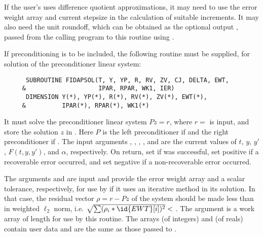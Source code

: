 \begin{Steps}
  If the user's  uses difference quotient approximations, it
  may need to use the error weight array  and current stepsize 
  in the calculation of suitable increments.  It may also need the unit
  roundoff, which can be obtained as the optional output ,
  passed from the calling program to this routine using .

  If preconditioning is to be included, the following routine must be
  supplied, for solution of the preconditioner linear system:
\begin{verbatim}
      SUBROUTINE FIDAPSOL(T, Y, YP, R, RV, ZV, CJ, DELTA, EWT, 
     &                    IPAR, RPAR, WK1, IER)
      DIMENSION Y(*), YP(*), R(*), RV(*), ZV(*), EWT(*), 
     &          IPAR(*), RPAR(*), WK1(*)
\end{verbatim}
  It must solve the preconditioner linear system $Pz = r$, where $r =$  
  is input, and store the solution $z$ in . Here $P$ is the left 
  preconditioner if  and the right preconditioner if .
  The input arguments , , , , and  are the
  current values of $t$, $y$, $y'$, $F(t,y,y')$, and $\alpha$, respectively.
  On return, set  if  was successful, set 
  positive if a recoverable error occurred, and set  negative if a 
  non-recoverable error occurred.

  The arguments  and  are input and provide the error weight
  array and a scalar tolerance, respectively, for use by  if it uses
  an iterative method in its solution.  In that case, the residual vector
  $\rho = r - Pz$ of the system should be made less than  in weighted
  $\ell_2$ norm, i.e. $\sqrt{\sum(\rho_i * \id{EWT}[i])^2} < $ .
  The argument  is a work array of length  for use by this
  routine.
  The arrays  (of integers) and  (of reals) contain user data
  and are the same as those passed to .


\end{Steps}
